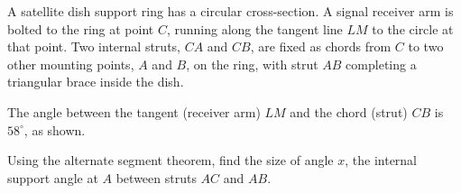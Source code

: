 \begin{question}
\noindent A satellite dish support ring has a circular cross-section. A signal receiver arm is bolted to the ring at point $C$, running along the tangent line $LM$ to the circle at that point. Two internal struts, $CA$ and $CB$, are fixed as chords from $C$ to two other mounting points, $A$ and $B$, on the ring, with strut $AB$ completing a triangular brace inside the dish.

\noindent The angle between the tangent (receiver arm) $LM$ and the chord (strut) $CB$ is $58^\circ$, as shown.

\begin{center}
\end{center}

\noindent Using the alternate segment theorem, find the size of angle $x$, the internal support angle at $A$ between struts $AC$ and $AB$.

\vspace{5cm}

\begin{flushright}
\end{flushright}
\end{question}
